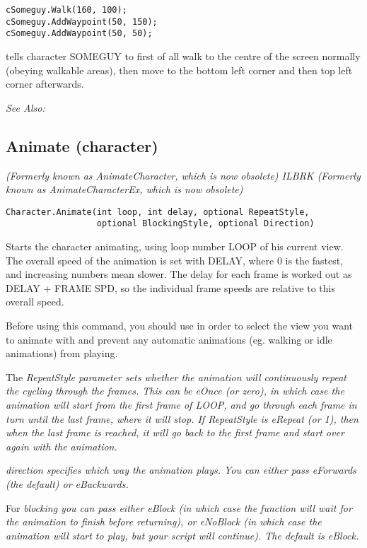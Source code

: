\begin{verbatim}
cSomeguy.Walk(160, 100);
cSomeguy.AddWaypoint(50, 150);
cSomeguy.AddWaypoint(50, 50);
\end{verbatim}
tells character SOMEGUY to first of all walk to the centre of the screen normally (obeying
walkable areas), then move to the bottom left corner and then top left corner afterwards.

\it{See Also:} 


\subsection{Animate (character)}\label{Character.Animate}%

\it{(Formerly known as AnimateCharacter, which is now obsolete)} ILBRK
\it{(Formerly known as AnimateCharacterEx, which is now obsolete)}

\begin{verbatim}
Character.Animate(int loop, int delay, optional RepeatStyle,
                  optional BlockingStyle, optional Direction)
\end{verbatim}
Starts the character animating, using loop number LOOP of his current view. The
overall speed of the animation is set with DELAY, where 0 is the fastest, and
increasing numbers mean slower. The delay for each frame is worked out as DELAY + FRAME SPD,
so the individual frame speeds are relative to this overall speed.

Before using this command, you should use  in order
to select the view you want to animate with and prevent any automatic animations (eg.
walking or idle animations) from playing.

The \it{RepeatStyle} parameter sets whether the animation will continuously repeat
the cycling through the frames. This can be \it{eOnce} (or zero), in which case the animation
will start from the first frame of LOOP, and go through each frame in turn until the
last frame, where it will stop. If RepeatStyle is \it{eRepeat} (or 1), then when the last frame
is reached, it will go back to the first frame and start over again with the animation.

\it{direction} specifies which way the animation plays. You can either pass eForwards (the
default) or eBackwards.

For \it{blocking} you can pass either eBlock (in which case the function will wait
for the animation to finish before returning), or eNoBlock (in which case the animation
will start to play, but your script will continue). The default is eBlock.

